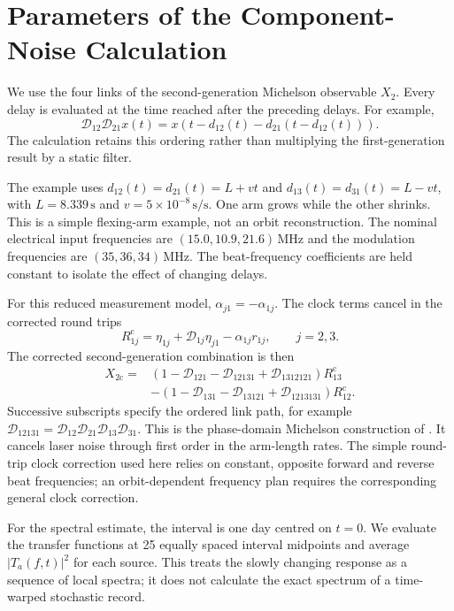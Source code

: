 \section{Parameters of the Component-Noise Calculation}
\label{app:noise_parameters}
We use the four links of the second-generation Michelson observable $X_2$. Every delay is evaluated at the time reached after the preceding delays. For example,
\begin{equation}
 \mathcal D_{12}\mathcal D_{21}x(t)
 =x\!\left(t-d_{12}(t)-d_{21}(t-d_{12}(t))\right).
\end{equation}
The calculation retains this ordering rather than multiplying the first-generation result by a static filter.

The example uses $d_{12}(t)=d_{21}(t)=L+vt$ and $d_{13}(t)=d_{31}(t)=L-vt$, with $L=8.339\,\mathrm s$ and $v=5\times10^{-8}\,\mathrm{s/s}$. One arm grows while the other shrinks. This is a simple flexing-arm example, not an orbit reconstruction. The nominal electrical input frequencies are $(15.0,10.9,21.6)\,\mathrm{MHz}$ and the modulation frequencies are $(35,36,34)\,\mathrm{MHz}$. The beat-frequency coefficients are held constant to isolate the effect of changing delays.

For this reduced measurement model, $\alpha_{j1}=-\alpha_{1j}$. The clock terms cancel in the corrected round trips
\begin{equation}
 R^{\mathrm c}_{1j}=\eta_{1j}+\mathcal D_{1j}\eta_{j1}-\alpha_{1j}r_{1j},
 \qquad j=2,3.
\end{equation}
The corrected second-generation combination is then
\begin{align}
 X_{2\mathrm c}={}&(1-\mathcal D_{121}-\mathcal D_{12131}
                  +\mathcal D_{1312121})R^{\mathrm c}_{13}\nonumber\\
 &-(1-\mathcal D_{131}-\mathcal D_{13121}
                  +\mathcal D_{1213131})R^{\mathrm c}_{12}.
 \label{eq:performance_x2}
\end{align}
Successive subscripts specify the ordered link path, for example $\mathcal D_{12131}=\mathcal D_{12}\mathcal D_{21}\mathcal D_{13}\mathcal D_{31}$. This is the phase-domain Michelson construction of \cite{hartwig_clock-jitter_2021}. It cancels laser noise through first order in the arm-length rates. The simple round-trip clock correction used here relies on constant, opposite forward and reverse beat frequencies; an orbit-dependent frequency plan requires the corresponding general clock correction.


For the spectral estimate, the interval is one day centred on $t=0$. We evaluate the transfer functions at 25 equally spaced interval midpoints and average $|T_a(f,t)|^2$ for each source. This treats the slowly changing response as a sequence of local spectra; it does not calculate the exact spectrum of a time-warped stochastic record.

